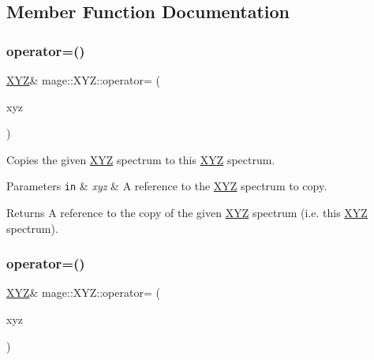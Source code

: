 \subsection{Member Function Documentation}
\hypertarget{structmage_1_1_x_y_z_a5fab016e78603641dc590e05646e4307}{}\label{structmage_1_1_x_y_z_a5fab016e78603641dc590e05646e4307} 
\subsubsection{\texorpdfstring{operator=()}{operator=()}\hspace{0.1cm}{\footnotesize\ttfamily [1/2]}}
{\footnotesize\ttfamily \hyperlink{structmage_1_1_x_y_z}{X\+YZ}\& mage\+::\+X\+Y\+Z\+::operator= (\begin{DoxyParamCaption}\item[{const \hyperlink{structmage_1_1_x_y_z}{X\+YZ} \&}]{xyz }\end{DoxyParamCaption})\hspace{0.3cm}{\ttfamily [default]}}

Copies the given \hyperlink{structmage_1_1_x_y_z}{X\+YZ} spectrum to this \hyperlink{structmage_1_1_x_y_z}{X\+YZ} spectrum.


\begin{DoxyParams}[1]{Parameters}
\mbox{\tt in}  & {\em xyz} & A reference to the \hyperlink{structmage_1_1_x_y_z}{X\+YZ} spectrum to copy. \\
\hline
\end{DoxyParams}
\begin{DoxyReturn}{Returns}
A reference to the copy of the given \hyperlink{structmage_1_1_x_y_z}{X\+YZ} spectrum (i.\+e. this \hyperlink{structmage_1_1_x_y_z}{X\+YZ} spectrum). 
\end{DoxyReturn}
\hypertarget{structmage_1_1_x_y_z_ad250bffabbd9c42cf7999165ae479ebf}{}\label{structmage_1_1_x_y_z_ad250bffabbd9c42cf7999165ae479ebf} 
\subsubsection{\texorpdfstring{operator=()}{operator=()}\hspace{0.1cm}{\footnotesize\ttfamily [2/2]}}
{\footnotesize\ttfamily \hyperlink{structmage_1_1_x_y_z}{X\+YZ}\& mage\+::\+X\+Y\+Z\+::operator= (\begin{DoxyParamCaption}\item[{\hyperlink{structmage_1_1_x_y_z}{X\+YZ} \&\&}]{xyz }\end{DoxyParamCaption})\hspace{0.3cm}{\ttfamily [default]}}

